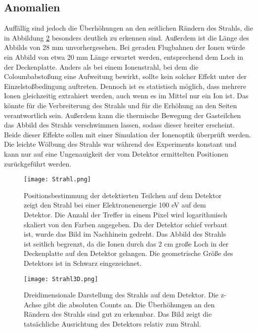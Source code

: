 \subsection{Anomalien}
\label{sec:Anomalien}
Auffällig sind jedoch die Überhöhungen an den seitlichen Rändern des Strahls, die in Abbildung \ref{fig:Strahl3D} besonders deutlich zu erkennen sind. Außerdem ist die Länge des Abbilds von 28 mm unvorhergesehen. Bei geraden Flugbahnen der Ionen würde ein Abbild von etwa 20 mm Länge erwartet werden, entsprechend dem Loch in der Deckenplatte. Anders als bei einem Ionenstrahl, bei dem die Coloumbabstoßung eine Aufweitung bewirkt, sollte kein solcher Effekt unter der Einzelstoßbedingung auftreten. Dennoch ist es statistisch möglich, dass mehrere Ionen gleichzeitig extrahiert werden, auch wenn es im Mittel nur ein Ion ist. Das könnte für die Verbreiterung des Strahls und für die Erhöhung an den Seiten verantwortlich sein. Außerdem kann die thermische Bewegung der Gasteilchen das Abbild des Strahls verschwimmen lassen, sodass dieser breiter erscheint. Beide dieser Effekte sollen mit einer Simulation der Ionenoptik überprüft werden. Die leichte Wölbung des Strahls war während des Experiments konstant und kann nur auf eine Ungenauigkeit der vom Detektor ermittelten Positionen zurückgeführt werden. 
\begin{figure}
    \hspace{-1.1cm}\texttt{[image: Strahl.png]}
    \caption[Logarithmisches Abbild des Strahls auf dem Detektor]{Positionsbestimmung der detektierten Teilchen auf dem Detektor zeigt den Strahl bei einer Elektronenenergie 100 eV auf dem Detektor. Die Anzahl der Treffer in einem Pixel wird logarithmisch skaliert von den Farben angegeben. Da der Detektor schief verbaut ist, wurde das Bild im Nachhinein gedreht. Das Abbild des Strahls ist seitlich begrenzt, da die Ionen durch das 2 cm große Loch in der Deckenplatte auf den Detektor gelangen. Die geometrische Größe des Detektors ist in Schwarz eingezeichnet.}
    \label{fig:Strahl} 
\end{figure}

\begin{figure}
    \hspace*{-1cm}\texttt{[image: Strahl3D.png]}
    \caption[Dreidimensionale Darstellung des Strahls auf dem Detektor]{Dreidimensionale Darstellung des Strahls auf dem Detektor. Die z-Achse gibt die absoluten Counts an. Die Überhöhungen an den Rändern des Strahls sind gut zu erkennbar. Das Bild zeigt die tatsächliche Ausrichtung des Detektors relativ zum Strahl.}
    \label{fig:Strahl3D} 
\end{figure}

